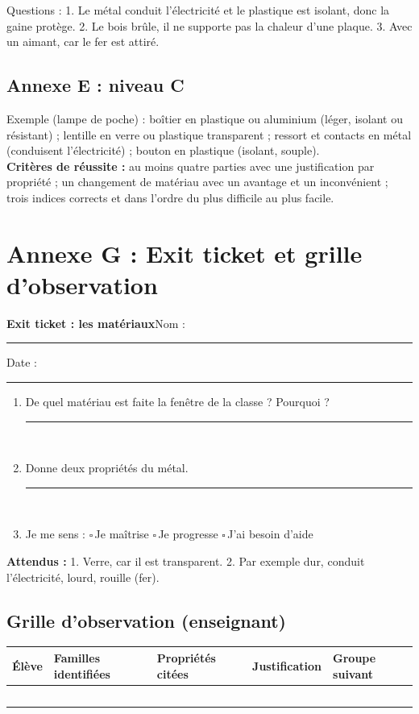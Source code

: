 \documentclass[11pt,a4paper]{article}
\newcommand{\cb}{$\square$\,}
\newcommand{\lig}{\noindent\rule{\linewidth}{0.3pt}\\[5mm]}
\newcommand{\entete}[2]{%
  \begin{tcolorbox}[colback=#1!10,colframe=#1!70!black,boxrule=0.8pt,arc=2mm]
  {\Large\bfseries #2}\hfill Nom : \rule{4cm}{0.3pt}\quad Date : \rule{2.2cm}{0.3pt}
  \end{tcolorbox}}
\begin{document}
\medskip
Questions : 1. Le métal conduit l'électricité et le plastique est isolant, donc la gaine protège. 2. Le bois brûle, il ne supporte pas la chaleur d'une plaque. 3. Avec un aimant, car le fer est attiré.

\subsection*{Annexe E : niveau C}
Exemple (lampe de poche) : boîtier en plastique ou aluminium (léger, isolant ou résistant) ; lentille en verre ou plastique transparent ; ressort et contacts en métal (conduisent l'électricité) ; bouton en plastique (isolant, souple).\\
\textbf{Critères de réussite :} au moins quatre parties avec une justification par propriété ; un changement de matériau avec un avantage et un inconvénient ; trois indices corrects et dans l'ordre du plus difficile au plus facile.

\newpage
\section*{Annexe G : Exit ticket et grille d'observation}
\entete{gray}{Exit ticket : les matériaux}

\begin{enumerate}
 \item De quel matériau est faite la fenêtre de la classe ? Pourquoi ?\\ \lig
 \item Donne deux propriétés du métal.\\ \lig
 \item Je me sens : \cb Je maîtrise \quad \cb Je progresse \quad \cb J'ai besoin d'aide
\end{enumerate}

\textbf{Attendus :} 1. Verre, car il est transparent. 2. Par exemple dur, conduit l'électricité, lourd, rouille (fer).

\bigskip
\subsection*{Grille d'observation (enseignant)}
\begin{tabularx}{\linewidth}{Y p{2.4cm} p{2.4cm} p{2.4cm} Y}
\toprule
Élève & Familles identifiées & Propriétés citées & Justification & Groupe suivant\\
\midrule
 & & & & \\ & & & & \\ & & & & \\ & & & & \\ & & & & \\
\bottomrule
\end{tabularx}
\end{document}
